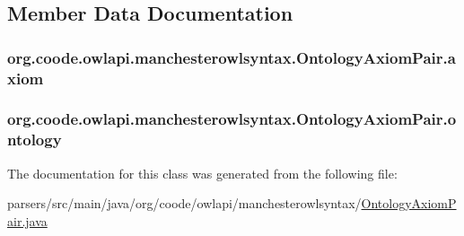 \subsection{Member Data Documentation}
\hypertarget{classorg_1_1coode_1_1owlapi_1_1manchesterowlsyntax_1_1_ontology_axiom_pair_a713e1a9f34ce9fc446078c4ecb938e6b}{
\subsubsection[{axiom}]{ org.\-coode.\-owlapi.\-manchesterowlsyntax.\-Ontology\-Axiom\-Pair.\-axiom\hspace{0.3cm}{\ttfamily [private]}}}\label{classorg_1_1coode_1_1owlapi_1_1manchesterowlsyntax_1_1_ontology_axiom_pair_a713e1a9f34ce9fc446078c4ecb938e6b}
\hypertarget{classorg_1_1coode_1_1owlapi_1_1manchesterowlsyntax_1_1_ontology_axiom_pair_ace199db27dc5c7c8914a8433ce7f4bac}{
\subsubsection[{ontology}]{ org.\-coode.\-owlapi.\-manchesterowlsyntax.\-Ontology\-Axiom\-Pair.\-ontology\hspace{0.3cm}{\ttfamily [private]}}}\label{classorg_1_1coode_1_1owlapi_1_1manchesterowlsyntax_1_1_ontology_axiom_pair_ace199db27dc5c7c8914a8433ce7f4bac}


The documentation for this class was generated from the following file\-:\begin{DoxyCompactItemize}
\item 
parsers/src/main/java/org/coode/owlapi/manchesterowlsyntax/\hyperlink{_ontology_axiom_pair_8java}{Ontology\-Axiom\-Pair.\-java}\end{DoxyCompactItemize}
